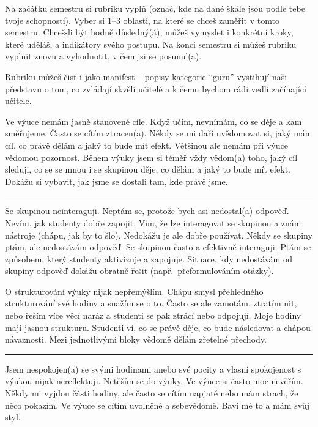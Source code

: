 Na začátku semestru si rubriku vyplň (označ, kde na dané škále jsou podle tebe tvoje schopnosti). Vyber si 1--3 oblasti, na které se chceš zaměřit v tomto semestru. Chceš-li být hodně důsledný(á), můžeš vymyslet i konkrétní kroky, které uděláš, a indikátory svého postupu. Na konci semestru si můžeš rubriku vyplnit znovu a vyhodnotit, v čem jsi se posunul(a).

Rubriku můžeš čist i jako manifest -- popisy kategorie \enquote{guru} vystihují naši představu o tom, co zvládají skvělí učitelé a k čemu bychom rádi vedli začínající učitele.


\newpage
{}
{Ve výuce nemám jasně stanovené cíle. Když učím, nevnímám, co se děje a kam směřujeme. Často se cítím ztracen(a).}
{Někdy se mi daří uvědomovat si, jaký mám cíl, co právě dělám a jaký to bude mít efekt. Většinou ale nemám při výuce vědomou pozornost.}
{Během výuky jsem si téměř vždy vědom(a) toho, jaký cíl sleduji, co se se mnou i se skupinou děje, co dělám a jaký to bude mít efekt. Dokážu si vybavit, jak jsme se dostali tam, kde právě jsme.}

\rule{\textwidth}{0.4pt}
{Se skupinou neinteraguji. Neptám se, protože bych asi nedostal(a) odpověď. Nevím, jak studenty dobře zapojit.}
{Vím, že lze interagovat se skupinou a znám nástroje (chápu, jak by to šlo). Nedokážu je ale dobře používat. Někdy  se skupiny ptám, ale nedostávám odpověď.}
{Se skupinou často a efektivně interaguji. Ptám se způsobem, který studenty aktivizuje a zapojuje. Situace, kdy nedostávám od skupiny odpověď dokážu obratně řešit (např.\ přeformulováním otázky).}

\newpage
{}
{O strukturování výuky nijak nepřemýšlím.}
{Chápu smysl přehledného strukturování své hodiny a snažím se o to. Často se ale zamotám, ztratím nit, nebo řeším více věcí naráz a studenti se pak ztrácí nebo odpojují.}
{Moje hodiny mají jasnou strukturu. Studenti ví, co se právě děje, co bude následovat a chápou návaznosti. Mezi jednotlivými bloky vědomě dělám zřetelné přechody.}

\rule{\textwidth}{0.4pt}
{Jsem nespokojen(a) se svými hodinami anebo své pocity a vlasní spokojenost s výukou nijak nereflektuji. Netěším se do výuky.}
{Ve výuce si často moc nevěřím. Někdy mi vyjdou části hodiny, ale často se cítím napjatě nebo mám strach, že něco pokazím.}
{Ve výuce se cítím uvolněně a sebevědomě. Baví mě to a mám svůj styl.}


